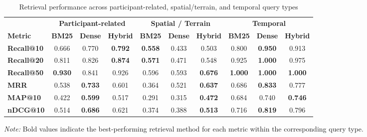 \begin{table}[H]
    \centering
    \caption{Retrieval performance across participant-related, spatial/terrain, and temporal query types}
    \label{tab:retrieval_query_types_1}

    \scriptsize
    \renewcommand{\arraystretch}{1.4}
    \setlength{\tabcolsep}{3pt}

    \begin{tabular}{l ccc ccc ccc}
        \toprule
        & \multicolumn{3}{c}{\textbf{Participant-related}}
        & \multicolumn{3}{c}{\textbf{Spatial / Terrain}}
        & \multicolumn{3}{c}{\textbf{Temporal}} \\
        \cmidrule(lr){2-4}
        \cmidrule(lr){5-7}
        \cmidrule(lr){8-10}

        \textbf{Metric} &
        \textbf{BM25} & \textbf{Dense} & \textbf{Hybrid} &
        \textbf{BM25} & \textbf{Dense} & \textbf{Hybrid} &
        \textbf{BM25} & \textbf{Dense} & \textbf{Hybrid} \\
        \midrule

        \textbf{Recall@10} &
        0.666 & 0.770 & \textbf{0.792} &
        \textbf{0.558} & 0.433 & 0.503 &
        0.800 & \textbf{0.950} & 0.913 \\

        \textbf{Recall@20} &
        0.811 & 0.826 & \textbf{0.874} &
        \textbf{0.571} & 0.471 & 0.548 &
        0.925 & \textbf{1.000} & 0.975 \\

        \textbf{Recall@50} &
        \textbf{0.930} & 0.841 & 0.926 &
        0.596 & 0.593 & \textbf{0.676} &
        \textbf{1.000} & \textbf{1.000} & \textbf{1.000} \\

        \textbf{MRR} &
        0.538 & \textbf{0.733} & 0.601 &
        0.364 & 0.521 & \textbf{0.637} &
        0.686 & \textbf{0.833} & 0.777 \\

        \textbf{MAP@10} &
        0.422 & \textbf{0.599} & 0.517 &
        0.291 & 0.315 & \textbf{0.472} &
        0.684 & 0.740 & \textbf{0.746} \\

        \textbf{nDCG@10} &
        0.514 & \textbf{0.686} & 0.621 &
        0.374 & 0.388 & \textbf{0.513} &
        0.716 & \textbf{0.819} & 0.796 \\

        \bottomrule
    \end{tabular}

    \par\vspace{4pt}
    \begin{minipage}{\linewidth}
        \footnotesize
        \textit{Note:} Bold values indicate the best-performing
        retrieval method for each metric within the corresponding
        query type.
    \end{minipage}

\end{table}
